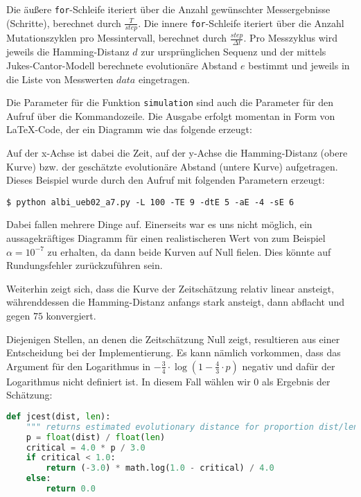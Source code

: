 \documentclass{homework}
\begin{document}
\begin{enumerate}
\begin{enumerate}
Die äußere \texttt{for}-Schleife iteriert über die Anzahl gewünschter
Messergebnisse (Schritte), berechnet durch $\frac{T}{step}$. Die innere
\texttt{for}-Schleife iteriert über die Anzahl Mutationszyklen pro
Messintervall, berechnet durch $\frac{step}{\Delta t}$. Pro Messzyklus wird
jeweils die Hamming-Distanz $d$ zur ursprünglichen Sequenz und der mittels
Jukes-Cantor-Modell berechnete evolutionäre Abstand $e$ bestimmt und jeweils in
die Liste von Messwerten $data$ eingetragen.

Die Parameter für die Funktion \texttt{simulation} sind auch die Parameter für
den Aufruf über die Kommandozeile. Die Ausgabe erfolgt momentan in Form von
\LaTeX-Code, der ein Diagramm wie das folgende erzeugt:

\begin{center}
\setlength{\unitlength}{0.1mm}

\end{center}

Auf der x-Achse ist dabei die Zeit, auf der y-Achse die Hamming-Distanz (obere
Kurve) bzw. der geschätzte evolutionäre Abstand (untere Kurve) aufgetragen.
Dieses Beispiel wurde durch den Aufruf mit folgenden Parametern erzeugt:

\texttt{\$ python albi\_ueb02\_a7.py -L 100 -TE 9 -dtE 5 -aE -4 -sE 6}

Dabei fallen mehrere Dinge auf. Einerseits war es uns nicht möglich, ein
aussagekräftiges Diagramm für einen realistischeren Wert von zum Beispiel
$\alpha = 10^{-7}$ zu erhalten, da dann beide Kurven auf Null fielen. Dies
könnte auf Rundungsfehler zurückzuführen sein.

Weiterhin zeigt sich, dass die Kurve der Zeitschätzung relativ linear ansteigt,
währenddessen die Hamming-Distanz anfangs stark ansteigt, dann abflacht und
gegen $75$ konvergiert.

Diejenigen Stellen, an denen die Zeitschätzung Null zeigt, resultieren aus einer
Entscheidung bei der Implementierung. Es kann nämlich vorkommen, dass das
Argument für den Logarithmus in
$- \frac{3}{4} \cdot \log(1 - \frac{4}{3} \cdot p)$
negativ und dafür der Logarithmus nicht definiert ist. In diesem Fall wählen wir
$0$ als Ergebnis der Schätzung:

\begin{lstlisting}[language=python]
def jcest(dist, len):
	""" returns estimated evolutionary distance for proportion dist/len of differences """
	p = float(dist) / float(len)
	critical = 4.0 * p / 3.0
	if critical < 1.0:
		return (-3.0) * math.log(1.0 - critical) / 4.0
	else:
		return 0.0
\end{lstlisting}


\end{enumerate}
\end{enumerate}
\end{document}
